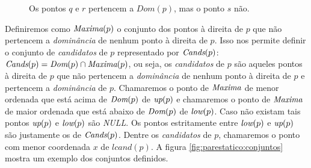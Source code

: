 \begin{figure}
    \centering
    \caption{Os pontos $q$ e $r$ pertencem a $Dom(p)$,
    mas o ponto $s$ não.}
    \label{fig:parestatico:dominancia}
\end{figure}

Definiremos como $\textit{Maxima}(p)$ o conjunto dos pontos à direita de $p$ que não
pertencem a \textit{dominância} de nenhum ponto à direita de $p$. Isso nos
permite definir o conjunto de \textit{candidatos} de $p$ representado por
$\textit{Cands}(p)$: $\textit{Cands}(p) = \textit{Dom}(p) \cap \textit{Maxima}(p)$, ou seja, os
\textit{candidatos} de $p$ são aqueles pontos à direita de $p$ que não
pertencem a \textit{dominância} de nenhum ponto à direita de $p$ e pertencem
a \textit{dominância} de $p$. Chamaremos o ponto de $\textit{Maxima}$ de menor
ordenada que está acima de $\textit{Dom}(p)$ de $\textit{up}(p)$ e chamaremos o ponto de
$\textit{Maxima}$ de maior ordenada que está abaixo de $\textit{Dom}(p)$ de $\textit{low}(p)$. Caso
não existam tais pontos $\textit{up}(p)$ e $\textit{low}(p)$ são \textit{NULL}. Os pontos
estritamente entre $\textit{low}(p)$ e $\textit{up}(p)$ são justamente os de $\textit{Cands}(p)$.
Dentre os \textit{candidatos} de $p$, chamaremos o ponto com menor
coordenada $x$ de $lcand(p)$. A figura
\ref{fig:parestatico:conjuntos}
mostra um exemplo dos conjuntos definidos.

